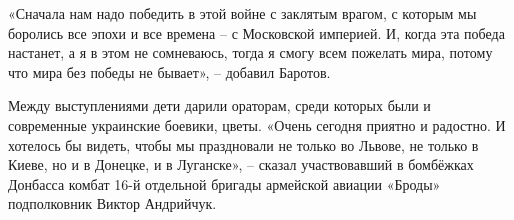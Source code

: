 «Сначала нам надо победить в этой войне с заклятым врагом, с которым мы
боролись все эпохи и все времена – с Московской империей. И, когда эта победа
настанет, а я в этом не сомневаюсь, тогда я смогу всем пожелать мира, потому
что мира без победы не бывает», – добавил Баротов.

Между выступлениями дети дарили ораторам, среди которых были и современные
украинские боевики, цветы.  «Очень сегодня приятно и радостно. И хотелось бы
видеть, чтобы мы праздновали не только во Львове, не только в Киеве, но и в
Донецке, и в Луганске», – сказал участвовавший в бомбёжках Донбасса комбат 16-й
отдельной бригады армейской авиации «Броды» подполковник Виктор Андрийчук.

